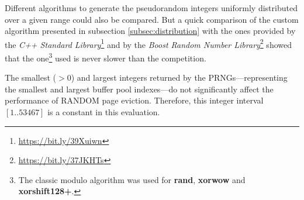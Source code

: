     Different algorithms to generate the pseudorandom integers uniformly distributed over a given range could also be compared. But a quick comparison of the custom algorithm presented in subsection \ref{subsec:distribution} with the ones provided by the \textit{C++ Standard Library}\footnote{\url{https://bit.ly/39Xuiwn}} and by the \textit{Boost Random Number Library}\footnote{\url{https://bit.ly/37JKHTs}} showed that the one\footnote{The classic modulo algorithm was used for \textbf{rand}, \textbf{xorwow} and \textbf{xorshift128+}.} used is never slower than the competition.

    The smallest ($>0$) and largest integers returned by the PRNGs---re\-pre\-sen\-ting the smallest and largest buffer pool indexes---do not significantly affect the performance of RANDOM page eviction. Therefore, this integer interval $\left[1 .. 53467\right]$ is a constant in this evaluation.


